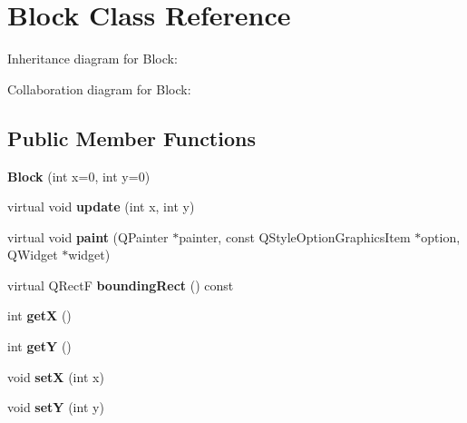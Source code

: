 \hypertarget{class_block}{\section{Block Class Reference}
\label{class_block}
}


Inheritance diagram for Block\-:


Collaboration diagram for Block\-:
\subsection*{Public Member Functions}
\begin{DoxyCompactItemize}
\item 
\hypertarget{class_block_aada344df339d2124eeaa726367ae27fe}{{\bfseries Block} (int x=0, int y=0)}\label{class_block_aada344df339d2124eeaa726367ae27fe}

\item 
\hypertarget{class_block_aa374e103c2ba9e060c4689f4da21a9ff}{virtual void {\bfseries update} (int x, int y)}\label{class_block_aa374e103c2ba9e060c4689f4da21a9ff}

\item 
\hypertarget{class_block_a8f526f6d76bf11afae85d8b23239cce2}{virtual void {\bfseries paint} (Q\-Painter $\ast$painter, const Q\-Style\-Option\-Graphics\-Item $\ast$option, Q\-Widget $\ast$widget)}\label{class_block_a8f526f6d76bf11afae85d8b23239cce2}

\item 
\hypertarget{class_block_aee4444b92a82f5a8080e9019ef1e554d}{virtual Q\-Rect\-F {\bfseries bounding\-Rect} () const }\label{class_block_aee4444b92a82f5a8080e9019ef1e554d}

\item 
\hypertarget{class_block_a527c8f990b4b99dda6f4ca225ee32c14}{int {\bfseries get\-X} ()}\label{class_block_a527c8f990b4b99dda6f4ca225ee32c14}

\item 
\hypertarget{class_block_a2501c303a7975db005ddc49d9551a51b}{int {\bfseries get\-Y} ()}\label{class_block_a2501c303a7975db005ddc49d9551a51b}

\item 
\hypertarget{class_block_ab9ac08d83a0e4ff7acb78029df4cc9e2}{void {\bfseries set\-X} (int x)}\label{class_block_ab9ac08d83a0e4ff7acb78029df4cc9e2}

\item 
\hypertarget{class_block_a57c1fcfd7d7cda4b9e21d69a25896c17}{void {\bfseries set\-Y} (int y)}\label{class_block_a57c1fcfd7d7cda4b9e21d69a25896c17}

\end{DoxyCompactItemize}
